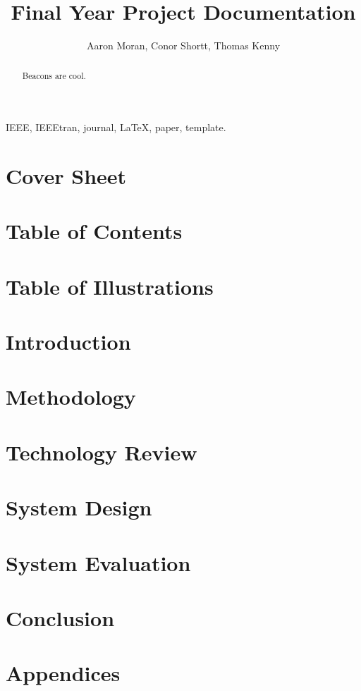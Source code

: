 \documentclass[journal]{IEEEtran}
\begin{document}
\title{Final Year Project Documentation}

\author{Aaron Moran, Conor Shortt, Thomas Kenny}
\date{}

\maketitle


\begin{abstract}
	Beacons are cool.
\end{abstract}

\begin{IEEEkeywords}
IEEE, IEEEtran, journal, \LaTeX, paper, template.
\end{IEEEkeywords}

\section{Cover Sheet}

\section{Table of Contents}

\section{Table of Illustrations}

\section{Introduction}

\section{Methodology}

\section{Technology Review}

\section{System Design}

\section{System Evaluation}

\section{Conclusion}

\section{Appendices}

\end{document}
